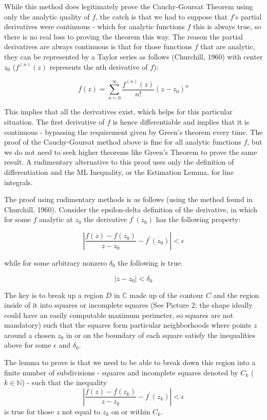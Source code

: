 \documentclass[11pt]{article}
\begin{document}
While this method does legitimately prove the Cauchy-Goursat Theorem using only the analytic quality of $f$, the catch is that we had to suppose that $f$'s partial derivatives were continuous - which for analytic functions $f$ this is always true, so there is no real loss to proving the theorem this way. The reason the partial derivatives are always continuous is that for those functions $f$ that are analytic, they can be represented by a Taylor series as follows (Churchill, 1960) with center $z_0$ ($f^{(n)}(z)$ represents the nth derivative of $f$):

$$f(z) = \sum_{n=0}^\infty \frac{f^{(n)}(z)}{n!}(z-z_0)^n$$

This implies that all the derivatives exist, which helps for this particular situation. The first derivative of $f$ is hence differentiable and implies that it is continuous - bypassing the requirement given by Green's theorem every time. The proof of the Cauchy-Goursat method above is fine for all analytic functions $f$, but we do not need to seek higher theorems like Green's Theorem to prove the same result. A rudimentary alternative to this proof uses only the definition of differentiation and the ML Inequality, or the Estimation Lemma, for line integrals.

The proof using rudimentary methods is as follows (using the method found in Churchill, 1960). Consider the epsilon-delta definition of the derivative, in which for some $f$ analytic at $z_0$ the derivative $f^{\prime}(z_0)$ has the following property:

$$\left|\frac{f(z) - f(z_0)}{z-z_0} - f^{\prime}(z_0)\right| < \epsilon$$
\centerline{while for some arbitrary nonzero $\delta_0$ the following is true:}
$$|z-z_0|<\delta_0$$

The key is to break up a region $D$ in $\mathbb{C}$ made up of the contour $C$ and the region inside of it into squares or incomplete squares (See Picture 2; the shape ideally could have an easily computable maximum perimeter, so squares are not mandatory) such that the squares form particular neighborhoods where points $z$ around a chosen $z_0$ in or on the boundary of each square satisfy the inequalities above for some $\epsilon$ and $\delta_0$.

The lemma to prove is that we need to be able to break down this region into a finite number of subdivisions - squares and incomplete squares denoted by $C_k$ ($k\in \mathbb{N}$) - such that the inequality
$$\left|\frac{f(z) - f(z_k)}{z-z_k} - f^{\prime}(z_k)\right| < \epsilon$$is true for those $z$ not equal to $z_k$ on or within $C_k$.
\end{document}
